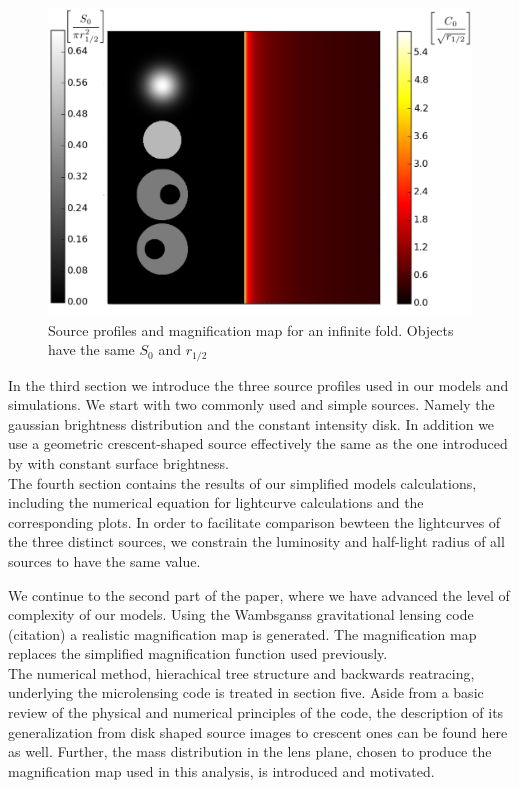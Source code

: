 \begin{figure}
\includegraphics[width = .8\textwidth]{plots/infinite_fold.eps}
\caption{\label{fig:infinite_fold}  Source profiles and magnification map for an infinite fold. Objects have the same $S_{0}$ and $r_{1/2}$ }
\end{figure}




In the third section we introduce the three source profiles used in our models and simulations. We start with two commonly used and simple sources. Namely the gaussian brightness distribution and the constant intensity disk. In addition we use a geometric crescent-shaped source effectively the same as the one introduced by \citep{2013MNRAS.434..765K} with constant surface brightness. \\
The fourth section contains the results of our simplified models calculations, including the numerical equation for lightcurve calculations and the corresponding plots. In order to facilitate comparison bewteen the lightcurves of the three distinct sources, we constrain the luminosity and half-light radius of all sources to have the same value.    
       
We continue to the second part of the paper, where we have advanced the level of complexity of our models. Using the Wambsganss gravitational lensing code (citation) a realistic magnification map is generated. The magnification map replaces the simplified magnification function used previously.  \\
The numerical method, hierachical tree structure and backwards reatracing, underlying the microlensing code is treated in section five. Aside from a basic review of the physical and numerical principles of the code, the description of its generalization from disk shaped source images to crescent ones can be found here as well. Further, the mass distribution in the lens plane, chosen to produce the magnification map used in this analysis, is introduced and motivated.   
